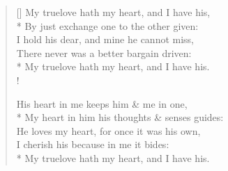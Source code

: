 \documentclass[MAIN]{subfiles}
\begin{document}
\settowidth{\versewidth}{My truelove hath my heart, and I have his}
\begin{verse}[\versewidth]
My truelove hath my heart, and I have his,\\*
By just exchange one to the other given:\\
I hold his dear, and mine he cannot miss,\\
There never was a better bargain driven:\\*
\vin My truelove hath my heart, and I have his.\\!

His heart in me keeps him \& me in one,\\*
My heart in him his thoughts \& senses guides:\\
He loves my heart, for once it was his own,\\
I cherish his because in me it bides:\\*
\vin My truelove hath my heart, and I have his.
\end{verse}
\end{document}
